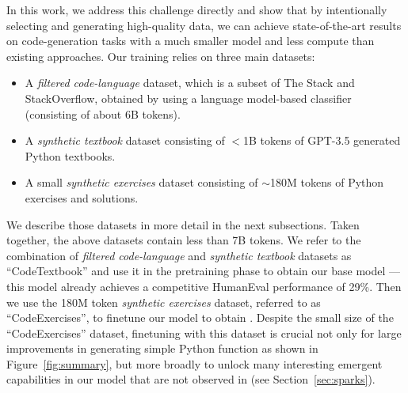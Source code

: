In this work, we address this challenge directly and show that by intentionally selecting and generating high-quality data, we can achieve state-of-the-art results on code-generation tasks with a much smaller model and less compute than existing approaches. Our training relies on three main datasets: 
\begin{itemize}
\item 
A \textit{filtered code-language} dataset, which is a subset of The Stack and StackOverflow, obtained by using a language model-based classifier (consisting of about 6B tokens).
\item 
A \textit{synthetic textbook} dataset consisting of $<$1B tokens of GPT-3.5 generated Python textbooks.
\item
A small \textit{synthetic exercises} dataset consisting of $\sim$180M tokens of Python exercises and solutions.
\end{itemize}
We describe those datasets in more detail in the next subsections. Taken together, the above datasets contain less than 7B tokens. We refer to the combination of \textit{filtered code-language} and \textit{synthetic textbook} datasets as ``CodeTextbook'' and use it in the pretraining phase to obtain our base model \phionebase\!\!---this model already achieves a competitive HumanEval performance of 29\%. Then we use the 180M token \textit{synthetic exercises} dataset, referred to as ``CodeExercises'', to finetune our \phionebase model to obtain \phione\!\!. Despite the small size of the ``CodeExercises'' dataset, finetuning with this dataset is crucial not only for large improvements in generating simple Python function as shown in Figure~\ref{fig:summary}, but more broadly to unlock many interesting emergent capabilities in our \phione model that are not observed in \phionebase (see Section~\ref{sec:sparks}). 

\iffalse
However, for learning foundational coding skills involving reasoning and algorithmic planning, many typical files, especially longer ones that dominate training loss, only provide a weak signal towards the task, due to the fact that typical examples in datasets such as The Stack have several drawbacks:

Furthermore, even files containing simple algorithmic problems have limited documentation of the functionality leading to further diminished signals mapping natural language to code. 

Thus, it is understandable that learning basic Python skills from such low signal sources would necessitate much longer training and/or larger models. In our work, we address this issue directly and show that by intentionally selecting for high quality data, we can beat the performance of models that are trained with orders of magnitude larger compute. 
\fi

